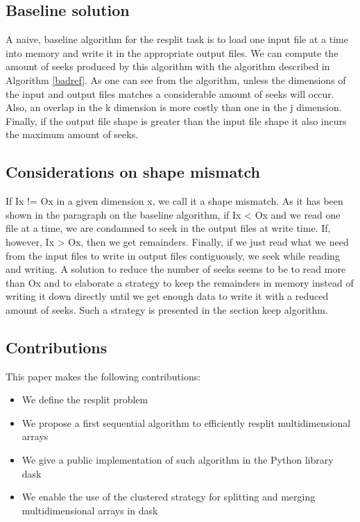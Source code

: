 \documentclass[conference]{IEEEtran}
\begin{document}
\subsection{Baseline solution}
A naive, baseline algorithm for the resplit task is to load one input file at a
time into memory and write it in the appropriate output files. We can compute
the amount of seeks produced by this algorithm with the algorithm described in
Algorithm \ref{badref}. As one can see from the algorithm, unless the dimensions
of the input and output
files matches a considerable amount of seeks will occur. Also, an overlap in the
k dimension is more costly than one in the j dimension. Finally, if the output
file shape is greater than the input file shape it also incurs the maximum amount
of seeks.

\subsection{Considerations on shape mismatch}
If Ix != Ox in a given dimension x, we call it a shape mismatch. As it has been
shown in the paragraph on the baseline algorithm, if Ix < Ox and we read one
file at a time, we are condamned to seek in the output files at write time. If,
however, Ix > Ox, then we get remainders. Finally, if we just read what we need
from the input files to write in output files contiguously, we seek while reading
and writing. A solution to reduce the number of seeks seems to be to read more
than Ox and to elaborate a strategy to keep the remainders in memory instead of
writing it down directly until we get enough data to write it with a reduced
amount of seeks. Such a strategy is presented in the section keep algorithm.

\subsection{Contributions}
This paper makes the following contributions:
\begin{itemize}
  \item We define the resplit problem
  \item We propose a first sequential algorithm to efficiently resplit multidimensional arrays
  \item We give a public implementation of such algorithm in the Python library dask
  \item We enable the use of the clustered strategy for splitting and merging multidimensional arrays in dask
\end{itemize}
\end{document}
